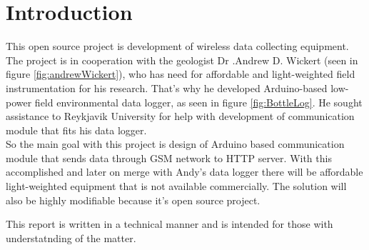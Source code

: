 \section*{Introduction}
This open source project is development of wireless data collecting equipment. The project is in cooperation with the geologist Dr .Andrew D. Wickert (seen in figure \ref{fig:andrewWickert}), who has need for affordable and light-weighted field instrumentation for his research. That's why he developed Arduino-based low-power field environmental data logger, as seen in figure \ref{fig:BottleLog}. He sought assistance to Reykjavik University for help with development of communication module that fits his data logger.\\
So the main goal with this project is design of Arduino based communication module that sends data through GSM network to HTTP server. With this accomplished and later on merge with Andy's data logger there will be affordable light-weighted equipment that is not available commercially. The solution will also be highly modifiable because it's open source project.

This report is written in a technical manner and is intended for those with understatnding of the matter.